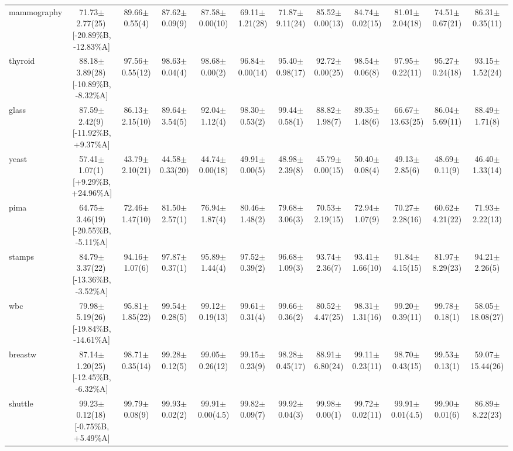\documentclass[conference]{IEEEtran}
\begin{document}
\begin{table}
{\begin{tabular}{lccccccccccc}
				mammography & 71.73$\pm$2.77(25)\,[{-}20.89\%B, {-}12.83\%A] & 89.66$\pm$0.55(4) & 87.62$\pm$0.09(9) & 87.58$\pm$0.00(10) & 69.11$\pm$1.21(28) & 71.87$\pm$9.11(24) & 85.52$\pm$0.00(13) & 84.74$\pm$0.02(15) & 81.01$\pm$2.04(18) & 74.51$\pm$0.67(21) & 86.31$\pm$0.35(11) \\
				thyroid & 88.18$\pm$3.89(28)\,[{-}10.89\%B, {-}8.32\%A] & 97.56$\pm$0.55(12) & 98.63$\pm$0.04(4) & 98.68$\pm$0.00(2) & 96.84$\pm$0.00(14) & 95.40$\pm$0.98(17) & 92.72$\pm$0.00(25) & 98.54$\pm$0.06(8) & 97.95$\pm$0.22(11) & 95.27$\pm$0.24(18) & 93.15$\pm$1.52(24) \\
				glass & 87.59$\pm$2.42(9)\,[{-}11.92\%B, {+}9.37\%A] & 86.13$\pm$2.15(10) & 89.64$\pm$3.54(5) & 92.04$\pm$1.12(4) & 98.30$\pm$0.53(2) & 99.44$\pm$0.58(1) & 88.82$\pm$1.98(7) & 89.35$\pm$1.48(6) & 66.67$\pm$13.63(25) & 86.04$\pm$5.69(11) & 88.49$\pm$1.71(8) \\
				yeast & 57.41$\pm$1.07(1)\,[{+}9.29\%B, {+}24.96\%A] & 43.79$\pm$2.10(21) & 44.58$\pm$0.33(20) & 44.74$\pm$0.00(18) & 49.91$\pm$0.00(5) & 48.98$\pm$2.39(8) & 45.79$\pm$0.00(15) & 50.40$\pm$0.08(4) & 49.13$\pm$2.85(6) & 48.69$\pm$0.11(9) & 46.40$\pm$1.33(14) \\
				pima & 64.75$\pm$3.46(19)\,[{-}20.55\%B, {-}5.11\%A] & 72.46$\pm$1.47(10) & 81.50$\pm$2.57(1) & 76.94$\pm$1.87(4) & 80.46$\pm$1.48(2) & 79.68$\pm$3.06(3) & 70.53$\pm$2.19(15) & 72.94$\pm$1.07(9) & 70.27$\pm$2.28(16) & 60.62$\pm$4.21(22) & 71.93$\pm$2.22(13) \\
				stamps & 84.79$\pm$3.37(22)\,[{-}13.36\%B, {-}3.52\%A] & 94.16$\pm$1.07(6) & 97.87$\pm$0.37(1) & 95.89$\pm$1.44(4) & 97.52$\pm$0.39(2) & 96.68$\pm$1.09(3) & 93.74$\pm$2.36(7) & 93.41$\pm$1.66(10) & 91.84$\pm$4.15(15) & 81.97$\pm$8.29(23) & 94.21$\pm$2.26(5) \\
				wbc & 79.98$\pm$5.19(26)\,[{-}19.84\%B, {-}14.61\%A] & 95.81$\pm$1.85(22) & 99.54$\pm$0.28(5) & 99.12$\pm$0.19(13) & 99.61$\pm$0.31(4) & 99.66$\pm$0.36(2) & 80.52$\pm$4.47(25) & 98.31$\pm$1.31(16) & 99.20$\pm$0.39(11) & 99.78$\pm$0.18(1) & 58.05$\pm$18.08(27) \\
				breastw & 87.14$\pm$1.20(25)\,[{-}12.45\%B, {-}6.32\%A] & 98.71$\pm$0.35(14) & 99.28$\pm$0.12(5) & 99.05$\pm$0.26(12) & 99.15$\pm$0.23(9) & 98.28$\pm$0.45(17) & 88.91$\pm$6.80(24) & 99.11$\pm$0.23(11) & 98.70$\pm$0.43(15) & 99.53$\pm$0.13(1) & 59.07$\pm$15.44(26) \\
				shuttle & 99.23$\pm$0.12(18)\,[{-}0.75\%B, {+}5.49\%A] & 99.79$\pm$0.08(9) & 99.93$\pm$0.02(2) & 99.91$\pm$0.00(4.5) & 99.82$\pm$0.09(7) & 99.92$\pm$0.04(3) & 99.98$\pm$0.00(1) & 99.72$\pm$0.02(11) & 99.91$\pm$0.01(4.5) & 99.90$\pm$0.01(6) & 86.89$\pm$8.22(23) \\

\end{tabular}}
\end{table}
\end{document}
